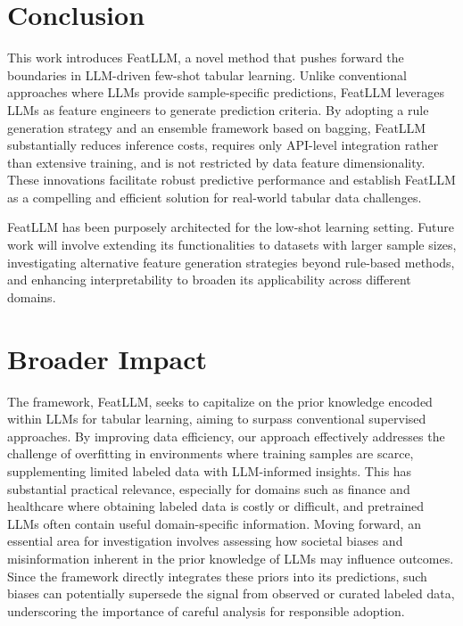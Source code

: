 \section{Conclusion}
This work introduces \textsf{FeatLLM}, a novel method that pushes forward the boundaries in LLM-driven few-shot tabular learning. Unlike conventional approaches where LLMs provide sample-specific predictions, \textsf{FeatLLM} leverages LLMs as feature engineers to generate prediction criteria. By adopting a rule generation strategy and an ensemble framework based on bagging, \textsf{FeatLLM} substantially reduces inference costs, requires only API-level integration rather than extensive training, and is not restricted by data feature dimensionality. These innovations facilitate robust predictive performance and establish \textsf{FeatLLM} as a compelling and efficient solution for real-world tabular data challenges.

\textsf{FeatLLM} has been purposely architected for the low-shot learning setting. Future work will involve extending its functionalities to datasets with larger sample sizes, investigating alternative feature generation strategies beyond rule-based methods, and enhancing interpretability to broaden its applicability across different domains.

\section{Broader Impact} The framework, \textsf{FeatLLM}, seeks to capitalize on the prior knowledge encoded within LLMs for tabular learning, aiming to surpass conventional supervised approaches. By improving data efficiency, our approach effectively addresses the challenge of overfitting in environments where training samples are scarce, supplementing limited labeled data with LLM-informed insights. This has substantial practical relevance, especially for domains such as finance and healthcare where obtaining labeled data is costly or difficult, and pretrained LLMs often contain useful domain-specific information. Moving forward, an essential area for investigation involves assessing how societal biases and misinformation inherent in the prior knowledge of LLMs may influence outcomes. Since the framework directly integrates these priors into its predictions, such biases can potentially supersede the signal from observed or curated labeled data, underscoring the importance of careful analysis for responsible adoption.


